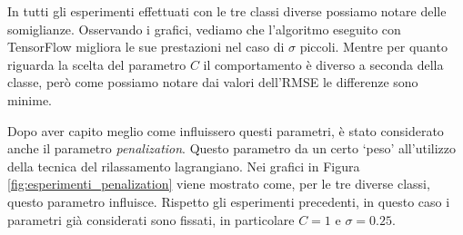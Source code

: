 \documentclass[a4paper,12pt]{report}
\begin{document}
\noindent In tutti gli esperimenti effettuati con le tre classi diverse possiamo notare delle somiglianze. Osservando i grafici, vediamo che l'algoritmo eseguito con TensorFlow migliora le sue prestazioni nel caso di $\sigma$ piccoli. Mentre per quanto riguarda la scelta del parametro $C$ il comportamento è diverso a seconda della classe, però come possiamo notare dai valori dell'RMSE le differenze sono minime.


Dopo aver capito meglio come influissero questi parametri, è stato considerato anche il parametro \textit{penalization}. Questo parametro da un certo `peso' all'utilizzo della tecnica del rilassamento lagrangiano. Nei grafici in Figura \ref{fig:esperimenti_penalization} viene mostrato come, per le tre diverse classi, questo parametro influisce. Rispetto gli esperimenti precedenti, in questo caso i parametri già considerati sono fissati, in particolare $C=1$ e $\sigma=0.25$. 
\end{document}
